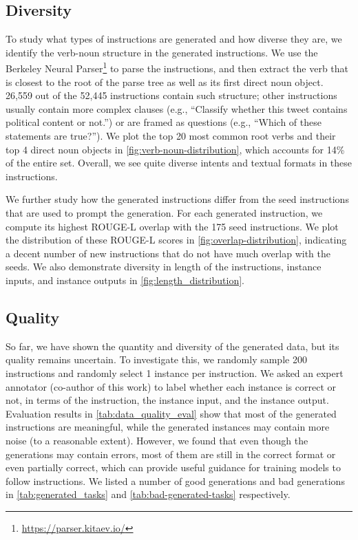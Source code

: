 \documentclass[11pt]{article}
\newcommand{\alisa}[1]{\textcolor{purple}{\textbf{[#1 -- \textsc{al}]}}}
\begin{document}
\subsection{Diversity}
\label{subsec:diversity}
To study what types of instructions are generated and how diverse they are, we identify the verb-noun structure in the generated instructions. We use the Berkeley Neural Parser\footnote{\url{https://parser.kitaev.io/}} \citep{kitaev-klein-2018-constituency,kitaev-etal-2019-multilingual} to parse the instructions, and then extract the verb that is closest to the root of the parse tree as well as its first direct noun object. 26,559 out of the 52,445 instructions contain such structure; other instructions usually contain more complex clauses (e.g., ``Classify whether this tweet contains political content or not.'') or are framed as questions (e.g., ``Which of these statements are true?''). 
We plot the top 20 most common root verbs and their top 4
direct noun objects in \autoref{fig:verb-noun-distribution}, which accounts for 14\% of the entire set. Overall, we see quite diverse intents and textual formats in these instructions.

We further study how the generated instructions differ from the seed instructions that are used to prompt the generation. For each generated instruction, we compute its highest ROUGE-L overlap with the 175 seed instructions. We plot the distribution of these ROUGE-L scores in \autoref{fig:overlap-distribution}, indicating a decent number of new instructions that do not have much overlap with the seeds. 
We also demonstrate diversity in length of the instructions, instance inputs, and instance outputs in \autoref{fig:length_distribution}. 

\subsection{Quality}
So far, we have shown the quantity and diversity of the generated data, but its quality remains uncertain. To investigate this, we randomly sample 200 instructions and randomly select 1 instance per instruction. We asked an expert annotator (co-author of this work) to label whether each instance is correct or not, in terms of the instruction, the instance input, and the instance output. 
Evaluation results in \autoref{tab:data_quality_eval} show that most of the generated instructions are meaningful, while the generated instances may contain more noise (to a reasonable extent). However, we found that even though the generations may contain errors, most of them are still in the correct format or even partially correct, which can provide useful guidance for training models to follow instructions. We listed a number of good generations and bad generations in \autoref{tab:generated_tasks} and \autoref{tab:bad-generated-tasks} respectively.
\end{document}
